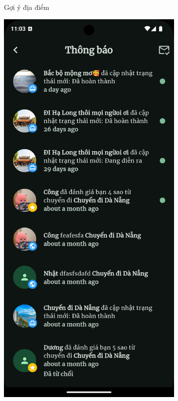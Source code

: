 \begin{figure}[H]
\begin{subfigure}{0.326\textwidth}
        \caption{Gợi ý địa điểm}
        \label{fig:func_recommend}
    \end{subfigure}
    \hfill
    \begin{subfigure}{0.326\textwidth}
        \includegraphics[width=1\linewidth]{figures/c4/system_func/noti.png}

\end{subfigure}
\end{figure}
